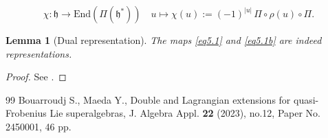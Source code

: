\documentclass[10pt,a4paper]{amsart}
\newtheorem{lemma}{Lemma}
\newcommand{\fh}{\mathfrak{h}}
\begin{document}
\begin{equation}\label{eq5.1b}
\chi: \fh \rightarrow \mathrm{End}(\Pi(\mathfrak{h}^*)) \quad u\mapsto \chi(u):= (-1)^{|u|}\, \Pi \circ \rho(u)\circ \Pi.
\end{equation} 

\begin{lemma}[Dual representation]
The maps \eqref{eq5.1} and \eqref{eq5.1b} are indeed representations. 

\end{lemma}

\begin{proof}
See \cite{BM}. 
\end{proof}

\begin{thebibliography}{99}
 Bouarroudj S., Maeda Y., Double and Lagrangian extensions for quasi-Frobenius Lie superalgebras, J. Algebra Appl. \textbf{22} (2023), no.12, Paper No. 2450001, 46 pp.
\end{thebibliography}
\end{document}
